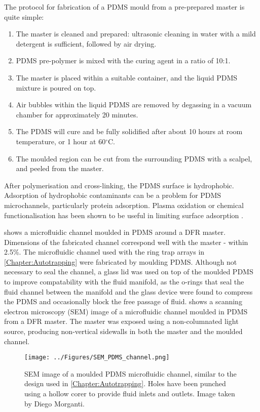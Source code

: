 The protocol for fabrication of a PDMS mould from a pre-prepared master is quite simple:
\begin{enumerate}
	\item The master is cleaned and prepared: ultrasonic cleaning in water with a mild detergent is sufficient, followed by air drying.
	\item PDMS pre-polymer is mixed with the curing agent in a ratio of 10:1.
	\item The master is placed within a suitable container, and the liquid PDMS mixture is poured on top.
	\item Air bubbles within the liquid PDMS are removed by degassing in a vacuum chamber for approximately 20 minutes.
	\item The PDMS will cure and be fully solidified after about 10 hours at room temperature, or 1 hour at 60$^{\circ}$C.
	\item The moulded region can be cut from the surrounding PDMS with a scalpel, and peeled from the master.
\end{enumerate}

After polymerisation and cross-linking, the PDMS surface is hydrophobic. Adsorption of hydrophobic contaminants can be a problem for PDMS microchannels, particularly protein adsorption. Plasma oxidation or chemical functionalisation has been shown to be useful in limiting surface adsorption \citep{McDonald:2000,Hillborg:2000}.

 shows a microfluidic channel moulded in PDMS around a DFR master. Dimensions of the fabricated channel correspond well with the master - within 2.5\%. The microfluidic channel used with the ring trap arrays in \cref{Chapter:Autotrapping} were fabricated by moulding PDMS. Although not necessary to seal the channel, a glass lid was used on top of the moulded PDMS to improve compatability with the fluid manifold, as the o-rings that seal the fluid channel between the manifold and the glass device were found to compress the PDMS and occasionally block the free passage of fluid.  shows a scanning electron microscopy (SEM) image of a microfluidic channel moulded in PDMS from a DFR master. The master was exposed using a non-columnated light source, producing non-vertical sidewalls in both the master and the moulded channel.

\begin{figure}
	\centering
		\texttt{[image: ../Figures/SEM\_PDMS\_channel.png]}
	\caption[SEM image of a moulded PDMS microfluidic channel.]{SEM image of a moulded PDMS microfluidic channel, similar to the design used in \cref{Chapter:Autotrapping}. Holes have been punched using a hollow corer to provide fluid inlets and outlets. Image taken by Diego Morganti.}
	\label{fig:SEM_PDMS_channel}
\end{figure}


